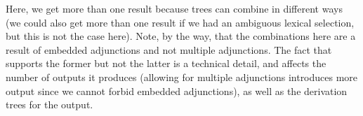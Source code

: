 Here, we get more than one result because trees can combine in different
ways (we could also get more than one result if we had an ambiguous
lexical selection, but this is not the case here).  Note, by the way, that
the combinations here are a result of embedded adjunctions and not
multiple adjunctions.  The fact that \geni supports the former but not
the latter is a technical detail, and affects the number of outputs it
produces (allowing for multiple adjunctions introduces more output since
we cannot forbid embedded adjunctions), as well as the derivation trees
for the output.

